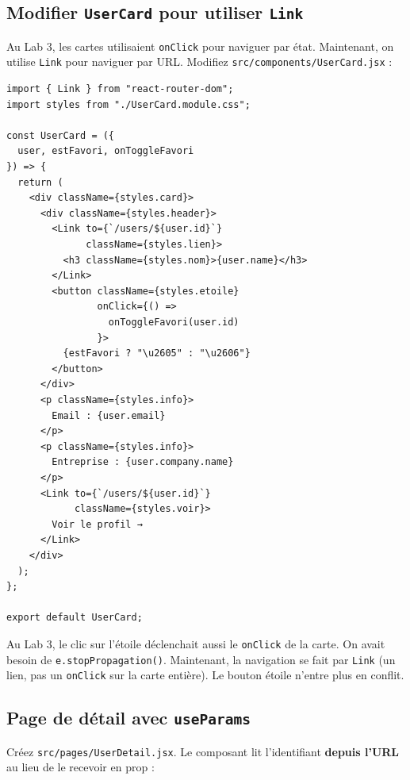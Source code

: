 \documentclass[11pt,a4paper]{article}
\begin{document}
\subsection{Modifier \texttt{UserCard} pour utiliser \texttt{Link}}

Au Lab 3, les cartes utilisaient \texttt{onClick} pour naviguer par état. Maintenant, on utilise \texttt{Link} pour naviguer par URL. Modifiez \texttt{src/components/UserCard.jsx} :

\begin{lstlisting}
import { Link } from "react-router-dom";
import styles from "./UserCard.module.css";

const UserCard = ({
  user, estFavori, onToggleFavori
}) => {
  return (
    <div className={styles.card}>
      <div className={styles.header}>
        <Link to={`/users/${user.id}`}
              className={styles.lien}>
          <h3 className={styles.nom}>{user.name}</h3>
        </Link>
        <button className={styles.etoile}
                onClick={() =>
                  onToggleFavori(user.id)
                }>
          {estFavori ? "\u2605" : "\u2606"}
        </button>
      </div>
      <p className={styles.info}>
        Email : {user.email}
      </p>
      <p className={styles.info}>
        Entreprise : {user.company.name}
      </p>
      <Link to={`/users/${user.id}`}
            className={styles.voir}>
        Voir le profil →
      </Link>
    </div>
  );
};

export default UserCard;
\end{lstlisting}

\begin{infobox}
Au Lab 3, le clic sur l'étoile déclenchait aussi le \texttt{onClick} de la carte. On avait besoin de \texttt{e.stopPropagation()}. Maintenant, la navigation se fait par \texttt{Link} (un lien, pas un \texttt{onClick} sur la carte entière). Le bouton étoile n'entre plus en conflit.
\end{infobox}

\subsection{Page de détail avec \texttt{useParams}}

Créez \texttt{src/pages/UserDetail.jsx}. Le composant lit l'identifiant \textbf{depuis l'URL} au lieu de le recevoir en prop :
\end{document}
